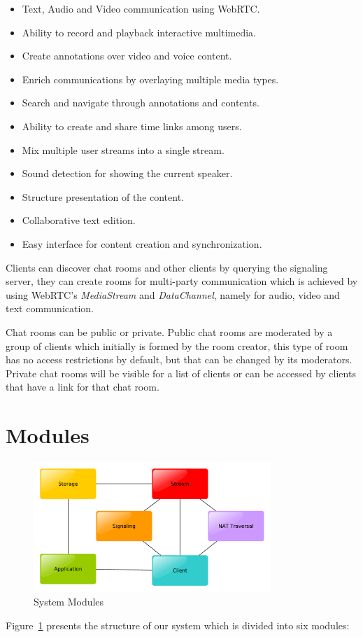 \begin{itemize}
 \item Text, Audio and Video communication using \ac{WebRTC}.
 \item Ability to record and playback interactive multimedia.
 \item Create annotations over video and voice content.
 \item Enrich communications by overlaying multiple media types.
 \item Search and navigate through annotations and contents.
 \item Ability to create and share time links among users.
 \item Mix multiple user streams into a single stream.
 \item Sound detection for showing the current speaker.
 \item Structure presentation of the content.
 \item Collaborative text edition.
 \item Easy interface for content creation and synchronization. 
\end{itemize}

	Clients can discover chat rooms and other clients by querying the signaling server, they can create rooms for multi-party communication which is achieved by using \ac{WebRTC}'s \emph{MediaStream} and \emph{DataChannel}, namely for audio, video and text communication.

	Chat rooms can be public or private. Public chat rooms are moderated by a group of clients which initially is formed by the room creator, this type of room has no access restrictions by default, but that can be changed by its moderators. Private chat rooms will be visible for a list of clients or can be accessed by clients that have a link for that chat room.

\section{Modules}

\begin{figure}[H]
	\centering
	\includegraphics[width=0.8\textwidth]{figures/modules.pdf}
	\caption{System Modules}
        \label{fig:modules}
\end{figure}
	Figure~\ref{fig:modules} presents the structure of our system which is divided into six modules:

